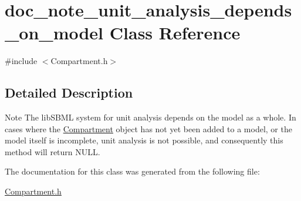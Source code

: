 \hypertarget{classdoc__note__unit__analysis__depends__on__model}{}\section{doc\+\_\+note\+\_\+unit\+\_\+analysis\+\_\+depends\+\_\+on\+\_\+model Class Reference}
\label{classdoc__note__unit__analysis__depends__on__model}


{\ttfamily \#include $<$Compartment.\+h$>$}



\subsection{Detailed Description}
\begin{DoxyNote}{Note}
The lib\+S\+B\+ML system for unit analysis depends on the model as a whole. In cases where the \hyperlink{class_compartment}{Compartment} object has not yet been added to a model, or the model itself is incomplete, unit analysis is not possible, and consequently this method will return {\ttfamily N\+U\+LL}. 
\end{DoxyNote}


The documentation for this class was generated from the following file\+:\begin{DoxyCompactItemize}
\item 
\hyperlink{_compartment_8h}{Compartment.\+h}\end{DoxyCompactItemize}

